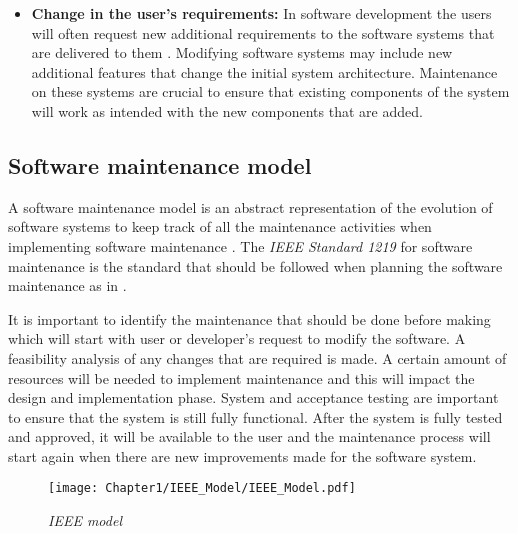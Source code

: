 \begin{itemize}
	\item \textbf{Change in the user's requirements:} In software development the users will often request new additional requirements to the software systems that are delivered to them \cite{Ogheneovo2014}. Modifying software systems may include new additional features that change the initial system architecture. Maintenance on these systems are crucial to ensure that existing components of the system will work as intended with the new components that are added.
\end{itemize}

\subsection{Software maintenance model}
A software maintenance model is an abstract representation of the evolution of software systems to keep track of all the maintenance activities when implementing software maintenance \cite{Ren2011}. The \textit{IEEE Standard 1219} for software maintenance is the standard that should be followed when planning the software maintenance as in .\par It is important to identify the maintenance that should be done before making which will start with user or developer's request to modify the software. A feasibility analysis of any changes that are required is made. A certain amount of resources will be needed to implement maintenance and this will impact the design and implementation phase. System and acceptance testing are important to ensure that the system is still fully functional. After the system is fully tested and approved, it will be available to the user and the maintenance process will start again when there are new improvements made for the software system.

\begin{figure}[!htb] %
	\centering %
	\texttt{[image: Chapter1/IEEE\_Model/IEEE\_Model.pdf]}
	\caption[IEEE model]
	{\textit{IEEE model \cite{Ren2011}}} \label{fig:CH1_IEEE_Model}
\end{figure}

